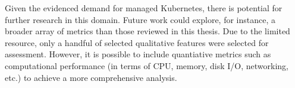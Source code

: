 Given the evidenced demand for managed Kubernetes, there is potential for further research in this domain. Future work could explore, for instance, a broader array of metrics than those reviewed in this thesis. Due to the limited resource, only a handful of selected qualitative features were selected for assessment. However, it is possible to include quantiative metrics such as computational performance (in terms of CPU, memory, disk I/O, networking, etc.) to achieve a more comprehensive analysis.























